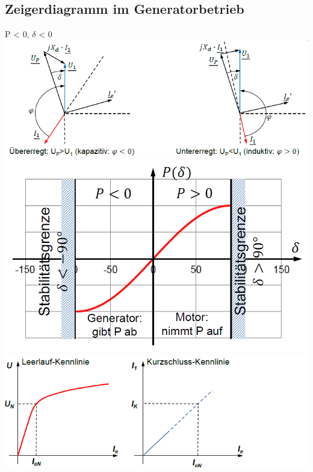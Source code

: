 \subsection{Zeigerdiagramm im Generatorbetrieb}
    P < 0, $\delta$ < 0  \newline
    \includegraphics[width = 14 cm]{images/ZeigerdiagrammGeneratorbetrieb} \newline \newline
    \includegraphics[scale = 0.35]{images/Stabilitaet}
    \includegraphics[scale = 0.7]{images/KennlinieSynchronmaschine}
\clearpage
\pagebreak
